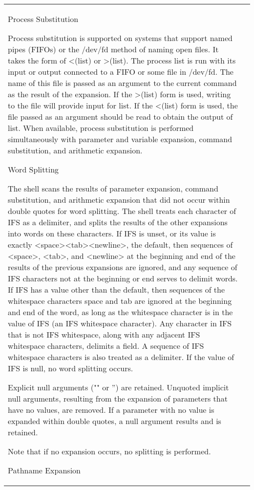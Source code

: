 \documentclass[11pt]{article}
\begin{document}
\begin{longtable}{p{}p{}}
{{{Process Substitution

Process substitution is supported on systems that support named pipes (FIFOs) or the /dev/fd method of naming open files. It takes the form of <(list) or >(list). The process list is run with its input or output connected to a FIFO or some file in /dev/fd. The name of this file is passed as an argument to the current command as the result of the expansion. If the >(list) form is used, writing to the file will provide input for list. If the <(list) form is used, the file passed as an argument should be read to obtain the output of list.
When available, process substitution is performed simultaneously with parameter and variable expansion, command substitution, and arithmetic expansion.

Word Splitting

The shell scans the results of parameter expansion, command substitution, and arithmetic expansion that did not occur within double quotes for word splitting.
The shell treats each character of IFS as a delimiter, and splits the results of the other expansions into words on these characters. If IFS is unset, or its value is exactly <space><tab><newline>, the default, then sequences of <space>, <tab>, and <newline> at the beginning and end of the results of the previous expansions are ignored, and any sequence of IFS characters not at the beginning or end serves to delimit words. If IFS has a value other than the default, then sequences of the whitespace characters space and tab are ignored at the beginning and end of the word, as long as the whitespace character is in the value of IFS (an IFS whitespace character). Any character in IFS that is not IFS whitespace, along with any adjacent IFS whitespace characters, delimits a field. A sequence of IFS whitespace characters is also treated as a delimiter. If the value of IFS is null, no word splitting occurs.

Explicit null arguments ("" or '') are retained. Unquoted implicit null arguments, resulting from the expansion of parameters that have no values, are removed. If a parameter with no value is expanded within double quotes, a null argument results and is retained.

Note that if no expansion occurs, no splitting is performed.

Pathname Expansion

}}}
\end{longtable}
\end{document}
